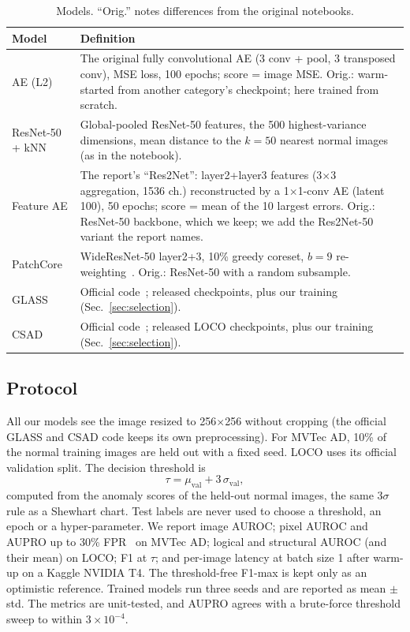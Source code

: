 \documentclass[conference]{IEEEtran}
\begin{document}
\begin{table}[t]
\caption{Models. ``Orig.'' notes differences from the original notebooks.}
\label{tab:models}
\centering\footnotesize
\begin{tabular}{@{}p{1.75cm}p{6.2cm}@{}}
\toprule
Model & Definition \\
\midrule
AE (L2) & The original fully convolutional AE (3 conv + pool, 3 transposed conv), MSE loss, 100 epochs; score = image MSE.
Orig.: warm-started from another category's checkpoint; here trained from scratch. \\
ResNet-50 + kNN & Global-pooled ResNet-50 features, the 500 highest-variance dimensions, mean distance to the
$k{=}50$ nearest normal images (as in the notebook). \\
Feature AE & The report's ``Res2Net'': layer2+layer3 features (3$\times$3 aggregation, 1536 ch.) reconstructed by a
1$\times$1-conv AE (latent 100), 50 epochs; score = mean of the 10 largest errors. Orig.: ResNet-50 backbone, which
we keep; we add the Res2Net-50 variant the report names. \\
PatchCore & WideResNet-50 layer2+3, 10\% greedy coreset, $b{=}9$ re-weighting~\cite{roth2022patchcore}. Orig.:
ResNet-50 with a random subsample. \\
GLASS & Official code~\cite{chen2024glass}; released checkpoints, plus our training (Sec.~\ref{sec:selection}). \\
CSAD & Official code~\cite{hsieh2024csad}; released LOCO checkpoints, plus our training (Sec.~\ref{sec:selection}). \\
\bottomrule
\end{tabular}
\end{table}

\subsection{Protocol}
All our models see the image resized to 256$\times$256 without cropping (the official GLASS and CSAD code keeps its
own preprocessing). For MVTec AD, 10\% of the normal training images are held out with a fixed seed. LOCO uses its
official validation split. The decision threshold is
\begin{equation}
\tau = \mu_{\text{val}} + 3\,\sigma_{\text{val}},
\end{equation}
computed from the anomaly scores of the held-out normal images, the same 3$\sigma$ rule as a Shewhart chart. Test
labels are never used to choose a threshold, an epoch or a hyper-parameter. We report image AUROC; pixel AUROC
and AUPRO up to 30\% FPR~\cite{bergmann2021mvtec} on MVTec AD; logical and structural AUROC (and their mean) on
LOCO; F1 at $\tau$; and per-image latency at batch size 1 after warm-up on a Kaggle NVIDIA T4. The threshold-free
F1-max is kept only as an optimistic reference. Trained models run three seeds and are reported as mean $\pm$
std. The metrics are unit-tested, and AUPRO agrees with a brute-force threshold sweep to within $3\times10^{-4}$.
\end{document}
